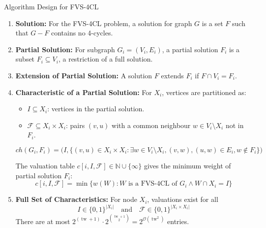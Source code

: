 \documentclass{beamer}
\newcommand{\tw}{\operatorname{tw}}
\begin{document}
\begin{frame}{Algorithm Design for FVS-4CL}
\footnotesize
\begin{enumerate}
    \item \textbf{Solution:} For the FVS-4CL problem, a solution for graph \(G\) is a set \(F\) such that \(G - F\) contains no 4-cycles.

    \item \textbf{Partial Solution:} For subgraph \(G_i = (V_i, E_i)\), a partial solution \(F_i\) is a subset \(F_i \subseteq V_i\), a restriction of a full solution.

    \item \textbf{Extension of Partial Solution:} A solution \(F\) extends \(F_i\) if \(F \cap V_i = F_i\).

    \item \textbf{Characteristic of a Partial Solution:} For \(X_i\), vertices are partitioned as:
    \begin{itemize}
        \item \(I \subseteq X_i\): vertices in the partial solution.
        \item \(\mathcal{F} \subseteq X_i \times X_i\): pairs \((v,u)\) with a common neighbour \(w \in V_i \setminus X_i\) not in \(F_i\).
    \end{itemize}
    \[
    ch(G_i, F_i) = \big(I, \{(v,u) \in X_i \times X_i : \exists w \in V_i \setminus X_i, (v,w), (u,w) \in E_i, w \notin F_i \}\big)
    \]

    The valuation table \(c[i, I, \mathcal{F}] \in \mathbb{N} \cup \{\infty\}\) gives the minimum weight of partial solution \(F_i\):
    \[
    c[i, I, \mathcal{F}] = \min \{ w(W) : W \text{ is a FVS-4CL of } G_i \land W \cap X_i = I \}
    \]

    \item \textbf{Full Set of Characteristics:} For node \(X_i\), valuations exist for all
    \[
    I \in \{0,1\}^{|X_i|} \quad \text{and} \quad \mathcal{F} \in \{0,1\}^{|X_i \times X_i|}
    \]
    There are at most \(2^{(\tw+1)} \cdot 2^{\binom{\tw+1}{2}} = 2^{\mathcal{O}(\tw^2)}\) entries.
\end{enumerate}

\end{frame}
\end{document}
